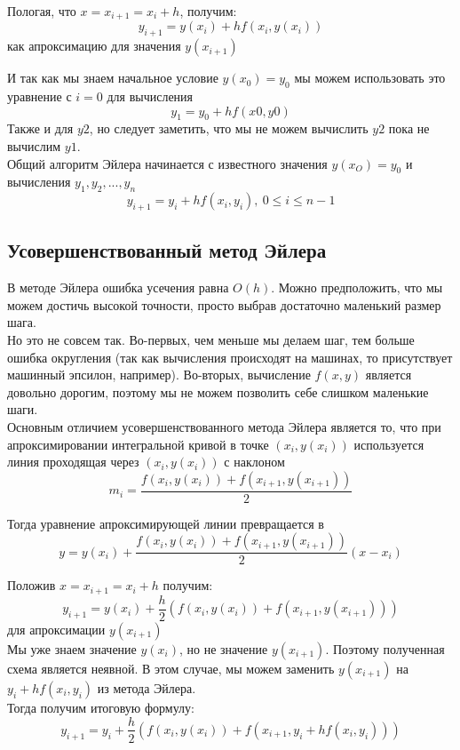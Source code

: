 \documentclass[11pt, english]{article}
\begin{document}
Пологая, что $x = x_{i + 1} = x_i + h$, получим:
$$y_{i + 1} = y(x_i) + hf(x_i, y(x_i))$$
как апроксимацию для значения $y(x_{i + 1})$

И так как мы знаем начальное условие $y(x_0) = y_0$ мы можем использовать это уравнение с $i = 0$ для вычисления
$$y_1 = y_0 + hf(x0, y0)$$
Также и для $y2$, но следует заметить, что мы не можем вычислить $y2$ пока не вычислим $y1$. \\

Общий алгоритм Эйлера начинается с известного значения $y(x_O) = y_0$ и вычисления $y_1, y_2, ... , y_n$
$$y_{i+1} = y_i + hf(x_i, y_i),\: 0 \leq i \leq n - 1$$

\subsection{Усовершенствованный метод Эйлера}

В методе Эйлера ошибка усечения равна $O(h)$. Можно предположить, что мы можем достичь высокой точности, просто выбрав достаточно маленький размер шага. \\

Но это не совсем так. Во-первых, чем меньше мы делаем шаг, тем больше ошибка округления (так как вычисления происходят на машинах, то присутствует машинный эпсилон, например). Во-вторых, вычисление $f(x,y)$ является довольно дорогим, поэтому мы не можем позволить себе слишком маленькие шаги. \\

Основным отличием усовершенствованного метода Эйлера является то, что при апроксимировании интегральной кривой в точке $(x_i, y(x_i))$ используется линия проходящая через $(x_i, y(x_i))$ с наклоном
$$m_i = \frac{f(x_i, y(x_i)) + f(x_{i+1}, y(x_{i+1}))}{2}$$

Тогда уравнение апроксимирующей линии превращается в
$$y = y(x_i) + \frac{f(x_i, y(x_i)) + f(x_{i+1}, y(x_{i+1}))}{2} (x - x_i)$$

Положив $x = x_{i+1} = x_i + h$ получим:
$$y_{i+1} = y(x_i) + \frac{h}{2}(f(x_i, y(x_i)) + f(x_{i+1}, y(x_{i+1})))$$
для апроксимации $y(x_{i+1})$ \\

Мы уже знаем значение $y(x_i)$, но не значение $y(x_{i+1})$. Поэтому полученная схема является неявной. В этом случае, мы можем заменить $y(x_{i+1})$ на $y_i + hf(x_i, y_i)$ из метода Эйлера. \\

Тогда получим итоговую формулу:
$$y_{i+1} = y_i + \frac{h}{2}(f(x_i, y(x_i)) + f(x_{i+1}, y_i + hf(x_i, y_i)))$$
\end{document}
